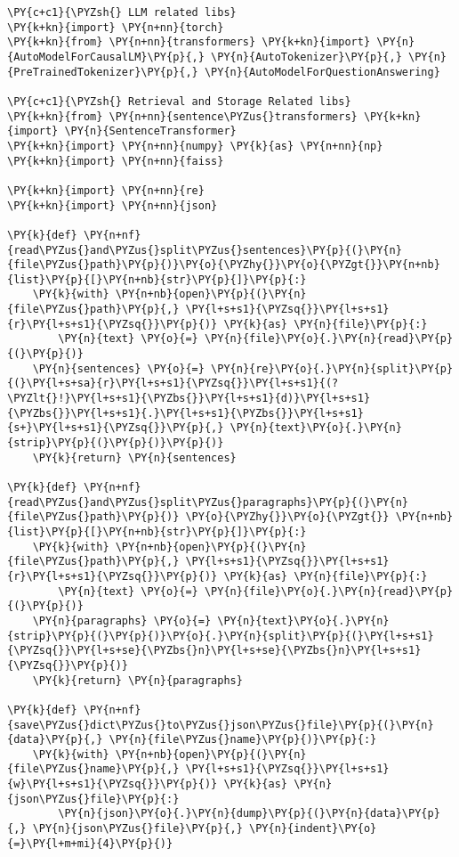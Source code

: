 \documentclass[11pt]{wseas}
\begin{document}
    \begin{tcolorbox}[breakable, size=fbox, boxrule=1pt, pad at break*=1mm,colback=cellbackground, colframe=cellborder]
\begin{Verbatim}[commandchars=\\\{\}]
\PY{c+c1}{\PYZsh{} LLM related libs}
\PY{k+kn}{import} \PY{n+nn}{torch}
\PY{k+kn}{from} \PY{n+nn}{transformers} \PY{k+kn}{import} \PY{n}{AutoModelForCausalLM}\PY{p}{,} \PY{n}{AutoTokenizer}\PY{p}{,} \PY{n}{PreTrainedTokenizer}\PY{p}{,} \PY{n}{AutoModelForQuestionAnswering}

\PY{c+c1}{\PYZsh{} Retrieval and Storage Related libs}
\PY{k+kn}{from} \PY{n+nn}{sentence\PYZus{}transformers} \PY{k+kn}{import} \PY{n}{SentenceTransformer}
\PY{k+kn}{import} \PY{n+nn}{numpy} \PY{k}{as} \PY{n+nn}{np}
\PY{k+kn}{import} \PY{n+nn}{faiss}

\PY{k+kn}{import} \PY{n+nn}{re}
\PY{k+kn}{import} \PY{n+nn}{json}

\PY{k}{def} \PY{n+nf}{read\PYZus{}and\PYZus{}split\PYZus{}sentences}\PY{p}{(}\PY{n}{file\PYZus{}path}\PY{p}{)}\PY{o}{\PYZhy{}}\PY{o}{\PYZgt{}}\PY{n+nb}{list}\PY{p}{[}\PY{n+nb}{str}\PY{p}{]}\PY{p}{:}
    \PY{k}{with} \PY{n+nb}{open}\PY{p}{(}\PY{n}{file\PYZus{}path}\PY{p}{,} \PY{l+s+s1}{\PYZsq{}}\PY{l+s+s1}{r}\PY{l+s+s1}{\PYZsq{}}\PY{p}{)} \PY{k}{as} \PY{n}{file}\PY{p}{:}
        \PY{n}{text} \PY{o}{=} \PY{n}{file}\PY{o}{.}\PY{n}{read}\PY{p}{(}\PY{p}{)}
    \PY{n}{sentences} \PY{o}{=} \PY{n}{re}\PY{o}{.}\PY{n}{split}\PY{p}{(}\PY{l+s+sa}{r}\PY{l+s+s1}{\PYZsq{}}\PY{l+s+s1}{(?\PYZlt{}!}\PY{l+s+s1}{\PYZbs{}}\PY{l+s+s1}{d)}\PY{l+s+s1}{\PYZbs{}}\PY{l+s+s1}{.}\PY{l+s+s1}{\PYZbs{}}\PY{l+s+s1}{s+}\PY{l+s+s1}{\PYZsq{}}\PY{p}{,} \PY{n}{text}\PY{o}{.}\PY{n}{strip}\PY{p}{(}\PY{p}{)}\PY{p}{)}
    \PY{k}{return} \PY{n}{sentences}

\PY{k}{def} \PY{n+nf}{read\PYZus{}and\PYZus{}split\PYZus{}paragraphs}\PY{p}{(}\PY{n}{file\PYZus{}path}\PY{p}{)} \PY{o}{\PYZhy{}}\PY{o}{\PYZgt{}} \PY{n+nb}{list}\PY{p}{[}\PY{n+nb}{str}\PY{p}{]}\PY{p}{:}
    \PY{k}{with} \PY{n+nb}{open}\PY{p}{(}\PY{n}{file\PYZus{}path}\PY{p}{,} \PY{l+s+s1}{\PYZsq{}}\PY{l+s+s1}{r}\PY{l+s+s1}{\PYZsq{}}\PY{p}{)} \PY{k}{as} \PY{n}{file}\PY{p}{:}
        \PY{n}{text} \PY{o}{=} \PY{n}{file}\PY{o}{.}\PY{n}{read}\PY{p}{(}\PY{p}{)}
    \PY{n}{paragraphs} \PY{o}{=} \PY{n}{text}\PY{o}{.}\PY{n}{strip}\PY{p}{(}\PY{p}{)}\PY{o}{.}\PY{n}{split}\PY{p}{(}\PY{l+s+s1}{\PYZsq{}}\PY{l+s+se}{\PYZbs{}n}\PY{l+s+se}{\PYZbs{}n}\PY{l+s+s1}{\PYZsq{}}\PY{p}{)}
    \PY{k}{return} \PY{n}{paragraphs}

\PY{k}{def} \PY{n+nf}{save\PYZus{}dict\PYZus{}to\PYZus{}json\PYZus{}file}\PY{p}{(}\PY{n}{data}\PY{p}{,} \PY{n}{file\PYZus{}name}\PY{p}{)}\PY{p}{:}
    \PY{k}{with} \PY{n+nb}{open}\PY{p}{(}\PY{n}{file\PYZus{}name}\PY{p}{,} \PY{l+s+s1}{\PYZsq{}}\PY{l+s+s1}{w}\PY{l+s+s1}{\PYZsq{}}\PY{p}{)} \PY{k}{as} \PY{n}{json\PYZus{}file}\PY{p}{:}
        \PY{n}{json}\PY{o}{.}\PY{n}{dump}\PY{p}{(}\PY{n}{data}\PY{p}{,} \PY{n}{json\PYZus{}file}\PY{p}{,} \PY{n}{indent}\PY{o}{=}\PY{l+m+mi}{4}\PY{p}{)}
\end{Verbatim}
\end{tcolorbox}
\end{document}
